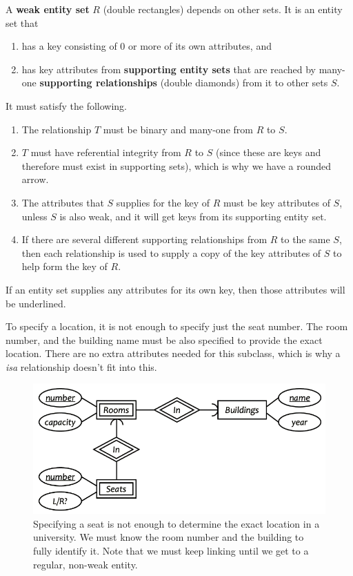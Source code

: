   \begin{definition}
    A \textbf{weak entity set} $R$ (double rectangles) depends on other sets. It is an entity set that 
    \begin{enumerate}
      \item has a key consisting of 0 or more of its own attributes, and 
      \item has key attributes from \textbf{supporting entity sets} that are reached by many-one \textbf{supporting relationships} (double diamonds) from it to other sets $S$. 
    \end{enumerate}
    It must satisfy the following. 
    \begin{enumerate}
      \item The relationship $T$ must be binary and many-one from $R$ to $S$. 
      \item $T$ must have referential integrity from $R$ to $S$ (since these are keys and therefore must exist in supporting sets), which is why we have a rounded arrow. 
      \item The attributes that $S$ supplies for the key of $R$ must be key attributes of $S$, unless $S$ is also weak, and it will get keys from its supporting entity set. 
      \item If there are several different supporting relationships from $R$ to the same $S$, then each relationship is used to supply a copy of the key attributes of $S$ to help form the key of $R$. 
    \end{enumerate}
    If an entity set supplies any attributes for its own key, then those attributes will be underlined. 
  \end{definition}

  \begin{example}
    To specify a location, it is not enough to specify just the seat number. The room number, and the building name must be also specified to provide the exact location. There are no extra attributes needed for this subclass, which is why a \textit{isa} relationship doesn't fit into this. 
    \begin{figure}[H]
      \centering 
      \includegraphics[scale=0.4]{img/weak_entity.png}
      \caption{Specifying a seat is not enough to determine the exact location in a university. We must know the room number and the building to fully identify it. Note that we must keep linking until we get to a regular, non-weak entity. } 
      \label{fig:weak_entity}
    \end{figure}
  \end{example}

